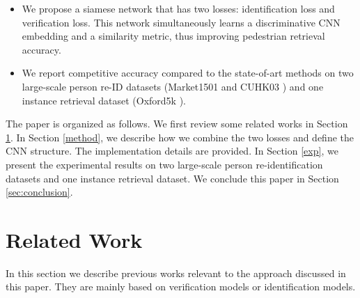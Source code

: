 \documentclass[journal]{IEEEtran}
\begin{document}
\begin{itemize}
\item We propose a siamese network that has two losses: identification loss and verification loss. This network simultaneously learns a discriminative CNN embedding and a similarity metric, thus improving pedestrian retrieval accuracy. 
\item We report competitive accuracy compared to the state-of-art methods on two large-scale person re-ID datasets (Market1501 \cite{zheng2015scalable} and CUHK03 \cite{li2014deepreid}) and one instance retrieval dataset (Oxford5k \cite{philbin2007object}).  
\end{itemize}


The paper is organized as follows. We first review some related works in Section \ref{sec:related_work}.
In Section \ref{method}, we describe how we combine the two losses and define the CNN structure. The implementation details are provided. In Section \ref{exp}, we present the experimental results on two large-scale person re-identification datasets and one instance retrieval dataset. We conclude this paper in Section \ref{sec:conclusion}.

\section{Related Work}\label{sec:related_work}
In this section we describe previous works relevant to the approach discussed in this paper.
They are mainly based on verification models or identification models.
\end{document}
